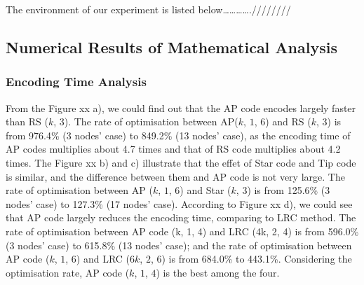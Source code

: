 \documentclass[sigconf]{acmart}
\begin{document}
The environment of our experiment is listed below………….////////\par


\subsection{Numerical Results of Mathematical Analysis}
\subsubsection{Encoding Time Analysis}
From the Figure xx a), we could find out that the AP code encodes largely faster than RS ($k$, $3$). The rate of optimisation between AP($k$, $1$, $6$) and RS ($k$, $3$) is from 976.4\% (3 nodes’ case) to 849.2\% (13 nodes’ case), as the encoding time of AP codes multiplies about 4.7 times and that of RS code multiplies about 4.2 times. The Figure xx b) and c) illustrate that the effet of Star code and Tip code is similar, and the difference between them and AP code is not very large. The rate of optimisation between AP ($k$, $1$, $6$) and Star ($k$, $3$) is from 125.6\% (3 nodes’ case) to 127.3\% (17 nodes’ case). According to Figure xx d), we could see that AP code largely reduces the encoding time, comparing to LRC method. The rate of optimisation between AP code (k, 1, 4) and LRC (4k, 2, 4) is from 596.0\% (3 nodes’ case) to 615.8\% (13 nodes’ case); and the rate of optimisation between AP code ($k$, $1$, $6$) and LRC ($6k$, $2$, $6$) is from 684.0\% to 443.1\%. Considering the optimisation rate, AP code ($k$, $1$, $4$) is the best among the four.\par
\end{document}
